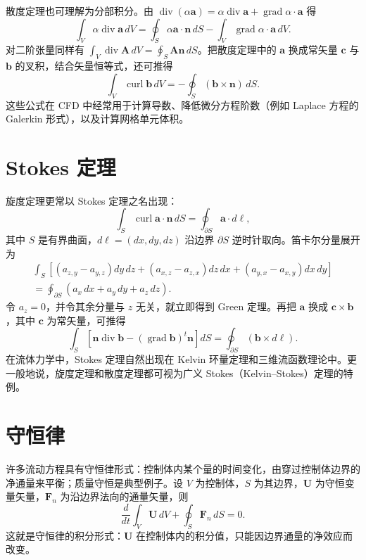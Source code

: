 \documentclass[11pt,a4paper,openany,fontset=none]{ctexbook}
\begin{document}
散度定理也可理解为分部积分。由 $\operatorname{div}(\alpha\bm a)=\alpha\operatorname{div}\bm a+\operatorname{grad}\alpha\cdot\bm a$ 得
\begin{equation}
 \int_V\alpha\operatorname{div}\bm a\,dV=\oint_S\alpha\bm a\cdot\bm n\,dS
 -\int_V\operatorname{grad}\alpha\cdot\bm a\,dV. \tag{1.12.5}
\end{equation}
对二阶张量同样有 $\int_V\operatorname{div}\bm A\,dV=\oint_S\bm A\bm n\,dS$。把散度定理中的 $\bm a$ 换成常矢量 $\bm c$ 与 $\bm b$ 的叉积，结合矢量恒等式，还可推得
\begin{equation}
 \int_V\operatorname{curl}\bm b\,dV=-\oint_S(\bm b\times\bm n)\,dS. \tag{1.12.10}
\end{equation}
这些公式在 CFD 中经常用于计算导数、降低微分方程阶数（例如 Laplace 方程的 Galerkin 形式），以及计算网格单元体积。

\section{Stokes 定理}

旋度定理更常以 Stokes 定理之名出现：
\begin{equation}
 \int_S\operatorname{curl}\bm a\cdot\bm n\,dS=\oint_{\partial S}\bm a\cdot d\bm\ell, \tag{1.13.1}
\end{equation}
其中 $S$ 是有界曲面，$d\bm\ell=(dx,dy,dz)$ 沿边界 $\partial S$ 逆时针取向。笛卡尔分量展开为
\begin{multline}
 \int_S\left[\left(a_{z,y}-a_{y,z}\right)dy\,dz+
 \left(a_{x,z}-a_{z,x}\right)dz\,dx+
 \left(a_{y,x}-a_{x,y}\right)dx\,dy\right]\\
 =\oint_{\partial S}(a_x\,dx+a_y\,dy+a_z\,dz). \tag{1.13.2}
\end{multline}
令 $a_z=0$，并令其余分量与 $z$ 无关，就立即得到 Green 定理。再把 $\bm a$ 换成 $\bm c\times\bm b$，其中 $\bm c$ 为常矢量，可推得
\begin{equation}
 \int_S\left[\bm n\operatorname{div}\bm b-(\operatorname{grad}\bm b)^t\bm n\right]dS
 =\oint_{\partial S}(\bm b\times d\bm\ell). \tag{1.13.7}
\end{equation}
在流体力学中，Stokes 定理自然出现在 Kelvin 环量定理和三维流函数理论中。更一般地说，旋度定理和散度定理都可视为广义 Stokes（Kelvin--Stokes）定理的特例。

\section{守恒律}

许多流动方程具有守恒律形式：控制体内某个量的时间变化，由穿过控制体边界的净通量来平衡；质量守恒是典型例子。设 $V$ 为控制体，$S$ 为其边界，$\bm U$ 为守恒变量矢量，$\bm F_n$ 为沿边界法向的通量矢量，则
\begin{equation}
 \frac{d}{dt}\int_V\bm U\,dV+\oint_S\bm F_n\,dS=0. \tag{1.14.1}
\end{equation}
这就是守恒律的积分形式：$\bm U$ 在控制体内的积分值，只能因边界通量的净效应而改变。
\end{document}

